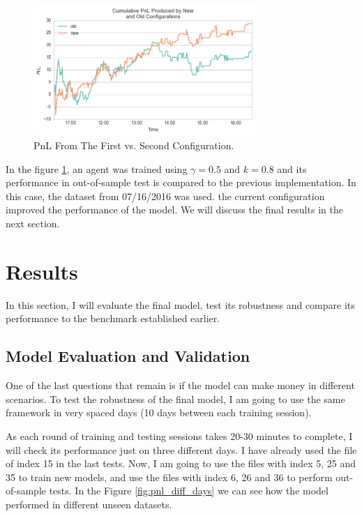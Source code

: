 \documentclass[a4paper]{article}
\begin{document}
\begin{figure}[ht]
\centering
\includegraphics[width=0.75\textwidth]{figures/old_new_comparition.png}
\caption{\label{fig:old_new_comparition}PnL From The First vs. Second Configuration.}
\end{figure}

In the figure \ref{fig:old_new_comparition}, an agent was trained using $\gamma=0.5$ and $k=0.8$ and its performance in out-of-sample test is compared to the previous implementation. In this case, the dataset from 07/16/2016 was used. the current configuration improved the performance of the model. We will discuss the final results in the next section.



\section{Results}
\label{sec:results}

In this section, I will evaluate the final model, test its robustness and compare its performance to the benchmark established earlier.

\subsection{Model Evaluation and Validation}
One of the last questions that remain is if the model can make money in different scenarios. To test the robustness of the final model, I am going to use the same framework in very spaced days (10 days between each training session).

As each round of training and testing sessions takes 20-30 minutes to complete, I will check its performance just on three different days. I have already used the file of index 15 in the last tests. Now, I am going to use the files with index 5, 25 and 35 to train new models, and use the files with index 6, 26 and 36 to perform out-of-sample tests. In the Figure \ref{fig:pnl_diff_days} we can see how the model performed in different unseen datasets.
\end{document}
